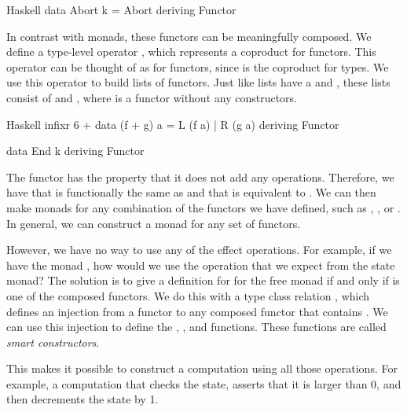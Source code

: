 \begin{lst}{Haskell}
data Abort k = Abort
  deriving Functor
\end{lst}
%
In contrast with monads, these functors can be meaningfully composed. We define a type-level operator \hs{+}, which represents a coproduct for functors. This operator can be thought of as  for functors, since  is the coproduct for types. We use this operator to build lists of functors. Just like lists have a  and , these lists consist of \hs{+} and , where  is a functor without any constructors.

\begin{lst}{Haskell}
infixr 6 +
data (f + g) a = L (f a) | R (g a)
  deriving Functor

data End k
  deriving Functor
\end{lst}
%
The  functor has the property that it does not add any operations. Therefore, we have that  is functionally the same as  and that  is equivalent to . We can then make monads for any combination of the functors we have defined, such as , , or . In general, we can construct a monad for any set of functors.

However, we have no way to use any of the effect operations. For example, if we have the monad , how would we use the  operation that we expect from the state monad? The solution is to give a definition for  for the free monad if and only if  is one of the composed functors. We do this with a type class relation \hs{<}, which defines an injection from a functor  to any composed functor  that contains . We can use this injection to define the , , and  functions. These functions are called \emph{smart constructors}.

%
This makes it possible to construct a computation using all those operations. For example, a computation that checks the state, asserts that it is larger than 0, and then decrements the state by 1.

